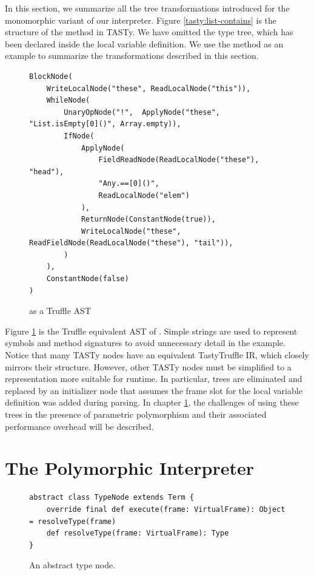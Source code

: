 In this section, we summarize all the tree transformations introduced for the monomorphic variant of our interpreter.
Figure \ref{tasty:list-contains} is the structure of the  method in TASTy.
We have omitted the type tree, which has been declared inside the local variable definition.
We use the  method as an example to summarize the transformations described in this section.

\begin{figure}[!htb]
\begin{verbatim}
BlockNode(
	WriteLocalNode("these", ReadLocalNode("this")),
	WhileNode(
		UnaryOpNode("!",  ApplyNode("these", "List.isEmpty[0]()", Array.empty)),
		IfNode(
			ApplyNode(
				FieldReadNode(ReadLocalNode("these"), "head"), 
				"Any.==[0]()", 
				ReadLocalNode("elem")
			),
			ReturnNode(ConstantNode(true)),
			WriteLocalNode("these",  ReadFieldNode(ReadLocalNode("these"), "tail")),	
		)   
	),
	ConstantNode(false)
)
\end{verbatim}
\caption{ as a Truffle AST}
\label{example:truffle-list-contains}
\end{figure}

Figure \ref{example:truffle-list-contains} is the Truffle equivalent AST of .
Simple strings are used to represent symbols and method signatures to avoid unnecessary detail in the example.
Notice that many TASTy nodes have an equivalent TastyTruffle IR, which closely mirrors their structure.
However, other TASTy nodes must be simplified to a representation more suitable for runtime.
In particular,  trees are eliminated and replaced by an initializer node that assumes the frame slot for the local variable definition was added during parsing.
In chapter \ref{implementation:specialization}, the challenges of using these trees in the presence of parametric polymorphism and their associated performance overhead will be described.

\chapter{The Polymorphic Interpreter}
\label{implementation:specialization}

\begin{figure}[!htb]
\begin{verbatim}
abstract class TypeNode extends Term {
	override final def execute(frame: VirtualFrame): Object = resolveType(frame)
	def resolveType(frame: VirtualFrame): Type 
}
\end{verbatim}
\caption{An abstract type node.}
\label{impl:type-node}
\end{figure}


